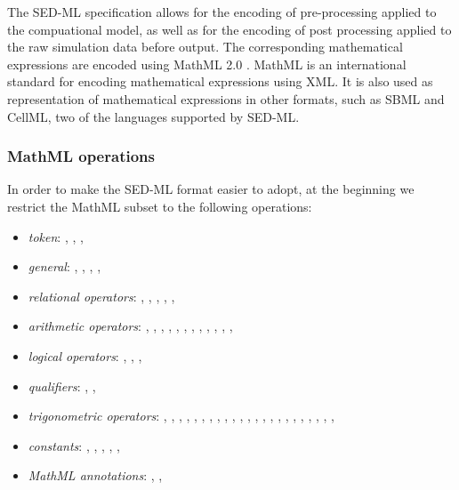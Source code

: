 \label{sec:mathML}
The SED-ML specification allows for the encoding of pre-processing applied to the compuational model,  as well as for the encoding of post processing applied to the raw simulation data before output. 
The corresponding mathematical expressions are encoded using MathML 2.0 \citep{CIM+01}. MathML is an international standard for encoding mathematical expressions using XML. It is also used as representation of mathematical expressions in other formats, such as SBML and CellML, two of the languages supported by SED-ML. 

\subsubsection{MathML operations}
In order to make the SED-ML format easier to adopt, at the beginning we restrict the MathML subset to the following operations: 

\begin{itemize}\setlength{\parskip}{-0.1ex}

\item \emph{token}: , , ,
  
\item \emph{general}: , ,
  , ,  

\item \emph{relational operators}: , ,
  , , , 

\item \emph{arithmetic operators}: , ,
  , , , ,
  , , , ,
  , , 

\item \emph{logical operators}: , ,
  , 

\item \emph{qualifiers}: , ,

\item \emph{trigonometric operators}: , ,
  , , , ,
  , , , ,
  , , , ,
  , , , ,
  , , ,
  , , 

\item \emph{constants}: , ,
  , , ,

\item \emph{MathML annotations}: ,
  , 
\end{itemize}

